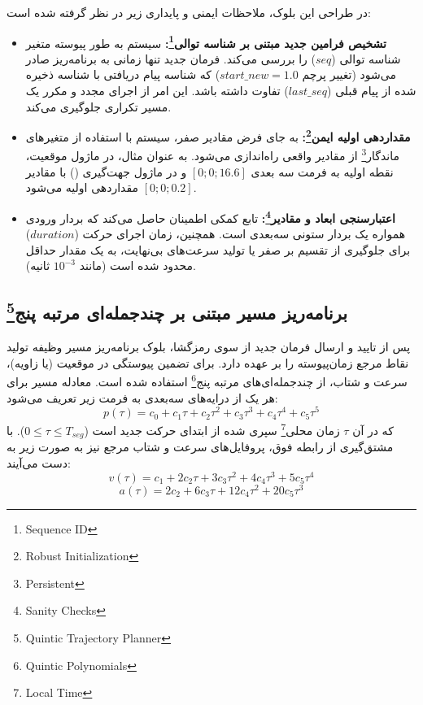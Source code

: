 	در طراحی این بلوک، ملاحظات ایمنی و پایداری زیر در نظر گرفته شده است:
	\begin{itemize}
		\item \textbf{تشخیص فرامین جدید مبتنی بر شناسه توالی\footnote{Sequence ID}:} سیستم به طور پیوسته متغیر شناسه توالی ($seq$) را بررسی می‌کند. فرمان جدید تنها زمانی به برنامه‌ریز صادر می‌شود (تغییر پرچم $start\_new = 1.0$) که شناسه پیام دریافتی با شناسه ذخیره شده از پیام قبلی ($last\_seq$) تفاوت داشته باشد. این امر از اجرای مجدد و مکرر یک مسیر تکراری جلوگیری می‌کند.
		\item \textbf{مقداردهی اولیه ایمن\footnote{Robust Initialization}:} به جای فرض مقادیر صفر، سیستم با استفاده از متغیرهای ماندگار\footnote{Persistent} از مقادیر واقعی راه‌اندازی می‌شود. به عنوان مثال، در ماژول موقعیت، نقطه اولیه به فرمت سه بعدی $[0; 0; 16.6]$ و در ماژول جهت‌گیری () با مقادیر $[0; 0; 0.2]$ مقداردهی اولیه می‌شود.
		\item \textbf{اعتبارسنجی ابعاد و مقادیر\footnote{Sanity Checks}:} تابع کمکی  اطمینان حاصل می‌کند که بردار ورودی همواره یک بردار ستونی سه‌بعدی است. همچنین، زمان اجرای حرکت ($duration$) برای جلوگیری از تقسیم بر صفر یا تولید سرعت‌های بی‌نهایت، به یک مقدار حداقل محدود شده است (مانند $10^{-3}$ ثانیه).
	\end{itemize}
	
	\subsection[برنامه‌ریز مسیر مبتنی بر چندجمله‌ای مرتبه پنج]{برنامه‌ریز مسیر مبتنی بر چندجمله‌ای مرتبه پنج\footnote{Quintic Trajectory Planner}}
	\label{subsec:method-quintic-planner}
	
	پس از تایید و ارسال فرمان جدید از سوی رمزگشا، بلوک برنامه‌ریز مسیر وظیفه تولید نقاط مرجع زمان‌پیوسته را بر عهده دارد. برای تضمین پیوستگی در موقعیت (یا زاویه)، سرعت و شتاب، از چندجمله‌ای‌های مرتبه پنج\footnote{Quintic Polynomials} استفاده شده است. معادله مسیر برای هر یک از درایه‌های سه‌بعدی به فرمت زیر تعریف می‌شود:
	$$ p(\tau) = c_0 + c_1 \tau + c_2 \tau^2 + c_3 \tau^3 + c_4 \tau^4 + c_5 \tau^5 $$
	که در آن $\tau$ زمان محلی\footnote{Local Time} سپری شده از ابتدای حرکت جدید است ($0 \le \tau \le T_{seg}$). با مشتق‌گیری از رابطه فوق، پروفایل‌های سرعت و شتاب مرجع نیز به صورت زیر به دست می‌آیند:
	$$ v(\tau) = c_1 + 2c_2 \tau + 3c_3 \tau^2 + 4c_4 \tau^3 + 5c_5 \tau^4 $$
	$$ a(\tau) = 2c_2 + 6c_3 \tau + 12c_4 \tau^2 + 20c_5 \tau^3 $$
	
